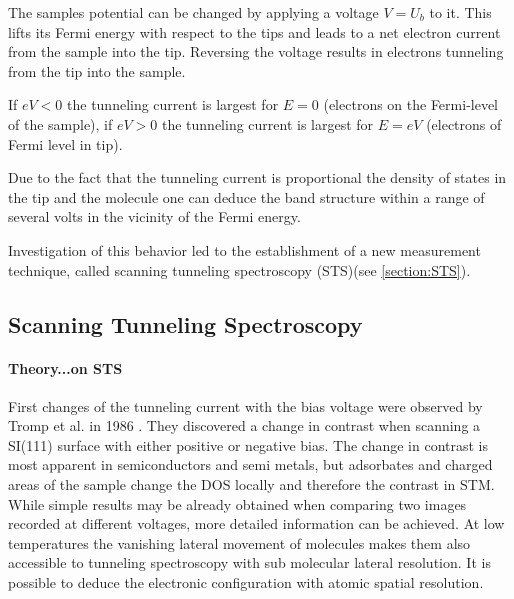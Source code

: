 The samples potential can be changed by applying a voltage $V=U_b$ to it. This lifts its Fermi energy with respect to the tips and leads to  a net electron current from the sample into the tip. Reversing the voltage results in electrons tunneling from the tip into the sample. 

If $eV<0$ the tunneling current is largest for $E=0$ (electrons on the Fermi-level of the sample), if $eV>0$ the tunneling current is largest for $E=eV$ (electrons of Fermi level in tip).

Due to the fact that the tunneling current is proportional the density of states in the tip and the molecule one can deduce the band structure within a range of several volts in the vicinity of the Fermi energy.

Investigation of this behavior led to the establishment of a new measurement technique, called scanning tunneling spectroscopy (STS)(see \autoref{section:STS}). 

\subsection{\textbf{S}canning \textbf{T}unneling \textbf{S}pectroscopy}
\paragraph{Theory...on STS}
\label{section:STS}
First changes of the tunneling current with the bias voltage were observed by Tromp et al. in 1986 \cite{tromp_atomic_1986}. They discovered a change in contrast when scanning a SI(111) surface with either positive or negative bias. The change in contrast is most apparent in semiconductors and semi metals\cite{bonnell_scanning_1993}, but adsorbates and charged areas of the sample change the DOS locally and therefore the contrast in STM. While simple results may be already obtained when comparing two images recorded at different voltages, more detailed information can be achieved. At low temperatures the vanishing lateral movement of molecules makes them also accessible to tunneling spectroscopy with sub molecular lateral resolution. It is possible to deduce the electronic configuration with atomic spatial resolution.

